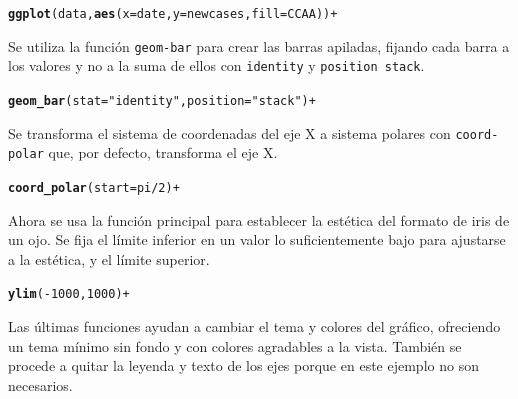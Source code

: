 \documentclass{article}\usepackage[]{graphicx}\usepackage[]{color}
\makeatletter
\newcommand{\hlstr}[1]{\textcolor[rgb]{0.192,0.494,0.8}{#1}}%
\newcommand{\hlkwd}[1]{\textcolor[rgb]{0.737,0.353,0.396}{\textbf{#1}}}%
\newenvironment{kframe}{%
 \def\at@end@of@kframe{}%
 \ifinner\ifhmode%
  \def\at@end@of@kframe{\end{minipage}}%
  \begin{minipage}{\columnwidth}%
 \fi\fi%
 \def\FrameCommand##1{\hskip\@totalleftmargin \hskip-\fboxsep
 \colorbox{shadecolor}{##1}\hskip-\fboxsep
     \hskip-\linewidth \hskip-\@totalleftmargin \hskip\columnwidth}%
 \MakeFramed {\advance\hsize-\width
   \@totalleftmargin\z@ \linewidth\hsize
   \@setminipage}}%
 {\par\unskip\endMakeFramed%
 \at@end@of@kframe}
\newenvironment{knitrout}{}{} %
\makeatother
\begin{document}
\begin{knitrout}
\color{fgcolor}\begin{kframe}
\begin{alltt}
\hlkwd{ggplot}(data, \hlkwd{aes}(x=date, y= newcases, fill = CCAA)) +
\end{alltt}
\end{kframe}
\end{knitrout}
Se utiliza la funci\'on \texttt{geom-bar} para crear las barras apiladas, fijando cada barra a los valores y no a la suma de ellos con \texttt{identity} y \texttt{position stack}.
\begin{knitrout}
\color{fgcolor}\begin{kframe}
\begin{alltt}
  \hlkwd{geom_bar}(stat = \hlstr{"identity"}, position = \hlstr{"stack"}) +
\end{alltt}
\end{kframe}
\end{knitrout}
Se transforma el sistema de coordenadas del eje X a sistema polares con \texttt{coord-polar} que, por defecto, transforma el eje X.
\begin{knitrout}
\color{fgcolor}\begin{kframe}
\begin{alltt}
  \hlkwd{coord_polar}(start = pi/2) +
\end{alltt}
\end{kframe}
\end{knitrout}
Ahora se usa la funci\'on principal para establecer la est\'etica del formato de iris de un ojo. Se fija el l\'imite inferior en un valor lo suficientemente bajo para ajustarse a la est\'etica, y el l\'imite superior.
\begin{knitrout}
\color{fgcolor}\begin{kframe}
\begin{alltt}
  \hlkwd{ylim}(-1000,1000) +
\end{alltt}
\end{kframe}
\end{knitrout}
Las \'ultimas funciones ayudan a cambiar el tema y colores del gr\'afico, ofreciendo un tema m\'inimo sin fondo y con colores agradables a la vista. Tambi\'en se procede a quitar la leyenda y texto de los ejes porque en este ejemplo no son necesarios.
\end{document}
